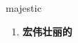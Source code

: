
\begin{frame}
{\huge majestic}
\begin{center}
\begin{enumerate}\Large
  \item \textbf{宏伟壮丽的}
\end{enumerate}
\end{center}
\end{frame}
